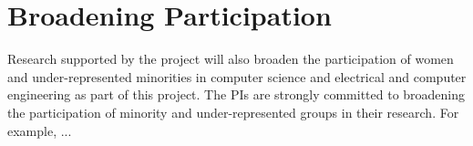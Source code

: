 \section{Broadening Participation}


Research supported by the project will also broaden the participation of women and under-represented
minorities in computer science and electrical and computer engineering
as part of this project. The PIs are strongly committed to broadening the
participation of minority and under-represented groups in their research. 
For example, ...